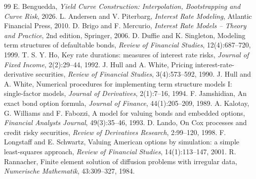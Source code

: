 \documentclass[11pt,a4paper]{article}
\begin{document}
\begin{thebibliography}{99}
 E. Benguedda, \emph{Yield Curve Construction: Interpolation, Bootstrapping and Curve
Risk}, 2026.
 L. Andersen and V. Piterbarg, \emph{Interest Rate Modeling}, Atlantic Financial Press, 2010.
 D. Brigo and F. Mercurio, \emph{Interest Rate Models -- Theory and Practice}, 2nd edition,
Springer, 2006.
 D. Duffie and K. Singleton, Modeling term structures of defaultable bonds, \emph{Review of
Financial Studies}, 12(4):687--720, 1999.
 T. S. Y. Ho, Key rate durations: measures of interest rate risks, \emph{Journal of Fixed Income},
2(2):29--44, 1992.
 J. Hull and A. White, Pricing interest-rate-derivative securities, \emph{Review of Financial
Studies}, 3(4):573--592, 1990.
 J. Hull and A. White, Numerical procedures for implementing term structure models I: single-factor
models, \emph{Journal of Derivatives}, 2(1):7--16, 1994.
 F. Jamshidian, An exact bond option formula, \emph{Journal of Finance}, 44(1):205--209, 1989.
 A. Kalotay, G. Williams and F. Fabozzi, A model for valuing bonds and embedded options,
\emph{Financial Analysts Journal}, 49(3):35--46, 1993.
 D. Lando, On Cox processes and credit risky securities, \emph{Review of Derivatives Research},
2:99--120, 1998.
 F. Longstaff and E. Schwartz, Valuing American options by simulation: a simple least-squares
approach, \emph{Review of Financial Studies}, 14(1):113--147, 2001.
 R. Rannacher, Finite element solution of diffusion problems with irregular data,
\emph{Numerische Mathematik}, 43:309--327, 1984.
\end{thebibliography}
\end{document}
